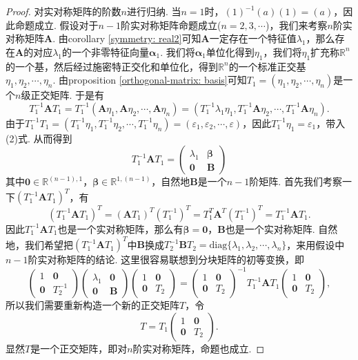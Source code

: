 \documentclass{article}
\newcommand{\mbf}[1]{\bm{#1}}
\begin{document}
\begin{proof}
对实对称矩阵的阶数$n$进行归纳. 当$n=1$时，$(1)^{-1}(a)(1) = (a)$，因此命题成立. 假设对于$n-1$阶实对称矩阵命题成立($n=2,3,\cdots$)，我们来考察$n$阶实对称矩阵$\mbf{A}$. 由corollary \ref{symmetry: real2}可知$\mbf{A}$一定存在一个特征值$\lambda_1$，那么存在$\mbf{A}$的对应$\lambda_1$的一个非零特征向量$\mbf{\alpha}_1$. 我们将$\mbf{\alpha}_1$单位化得到$\eta_1$，我们将$\eta_1$扩充称$\mathbb{R}^n$的一个基，然后经过施密特正交化和单位化，得到$\mathbb{R}^n$的一个标准正交基$\eta_1,\eta_2,\cdots,\eta_n$. 由proposition \ref{orthogonal-matrix: basis}可知$T_1=(\eta_1,\eta_2,\cdots,\eta_n)$是一个$n$级正交矩阵. 于是有
\begin{equation}
T_1^{-1}\mbf{A}T_1 = T_1^{-1}(\mbf{A}\eta_1,\mbf{A}\eta_2,\cdots,\mbf{A}\eta_n) = (T_1^{-1}\lambda_1\eta_1,T_1^{-1}\mbf{A}\eta_2,\cdots,T_1^{-1}\mbf{A}\eta_n).
\end{equation}
由于$T_1^{-1}T_1=(T_1^{-1}\eta_1,T_1^{-1}\eta_2,\cdots,T_1^{-1}\eta_n)=(\varepsilon_1,\varepsilon_2,\cdots,\varepsilon)$，因此$T_1^{-1}\eta_1=\varepsilon_1$，带入(2)式. 从而得到
$$
T_1^{-1}\mbf{A}T_1 = \begin{pmatrix}
\lambda_1 & \mbf{\beta} \\
\mbf{0} & \mbf{B} 
\end{pmatrix}
$$ 
其中$\mbf{0}\in \mathbb{R}^{(n-1),1}$，$\mbf{\beta} \in \mathbb{R}^{1,(n-1)}$，自然地$\mbf{B}$是一个$n-1$阶矩阵. 首先我们考察一下$(T_1^{-1}\mbf{A}T_1)^T$，有
$$
(T_1^{-1}\mbf{A}T_1)^T = (\mbf{A}T_1)^T(T_1^{-1})^{T} = T_1^T \mbf{A}^T ({T_1^{-1}})^T = T_1^{-1}\mbf{A}T_1. 
$$
因此$T_1^{-1}\mbf{A}T_1$也是一个实对称矩阵，那么有$\mbf{\beta}=\mbf{0}$，$\mbf{B}$也是一个实对称矩阵. 自然地，我们希望把$(T_1^{-1}\mbf{A}T_1)^T$中$\mbf{B}$换成$T_2^{-1}\mbf{B}T_2 = \text{diag}\{\lambda_1,\lambda_2,\cdots,\lambda_n\}$，来用假设中$n-1$阶实对称矩阵的结论. 这里很容易联想到{\color{blue}分块矩阵的初等变换}，即
$$
\begin{pmatrix}
1 & \mbf{0} \\
\mbf{0} & T_2^{-1}
\end{pmatrix}
\begin{pmatrix}
\lambda_1 & \mbf{0} \\
\mbf{0} & \mbf{B} 
\end{pmatrix}
\begin{pmatrix}
1 & \mbf{0} \\
\mbf{0} & T_2
\end{pmatrix}
= \begin{pmatrix}
1 & \mbf{0} \\
\mbf{0} & T_2
\end{pmatrix}^{-1}T_1^{-1}\mbf{A}T_1\begin{pmatrix}
1 & \mbf{0} \\
\mbf{0} & T_2
\end{pmatrix},
$$
所以我们需要重新构造一个新的正交矩阵$T$，令
$$
T = T_1\begin{pmatrix}
1 & \mbf{0} \\
\mbf{0} & T_2
\end{pmatrix}. 
$$
显然$T$是一个正交矩阵，即对$n$阶实对称矩阵，命题也成立. 
\end{proof}
\end{document}
